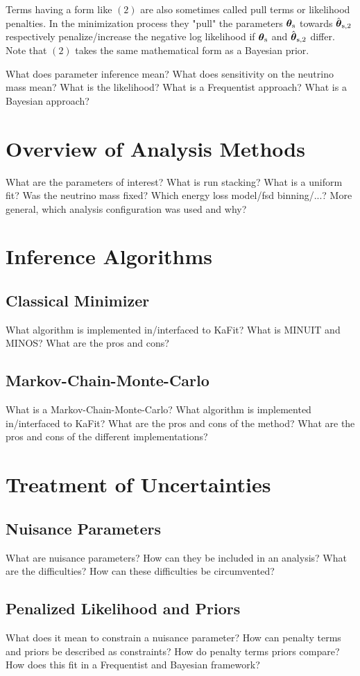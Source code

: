 Terms having a form like $(2)$ are also sometimes called pull terms or likelihood penalties. In the minimization process they "pull" the parameters $\boldsymbol{\mathbf{\theta}}_\mathrm{s}$ towards $\hat{\boldsymbol{\mathbf{\theta}}}_\mathrm{s,2}$ respectively penalize/increase the negative log likelihood if $\boldsymbol{\mathbf{\theta}}_\mathrm{s}$ and $\hat{\boldsymbol{\mathbf{\theta}}}_\mathrm{s,2}$ differ. Note that $(2)$ takes the same mathematical form as a Bayesian prior.

What does parameter inference mean? What does sensitivity on the neutrino mass mean? What is the likelihood? What is a Frequentist approach? What is a Bayesian approach? 
\section{Overview of Analysis Methods}
What are the parameters of interest? What is run stacking? What is a uniform fit? Was the neutrino mass fixed? Which energy loss model/fsd binning/...? More general, which analysis configuration was used and why?

\section{Inference Algorithms}
\subsection{Classical Minimizer}
What algorithm is implemented in/interfaced to KaFit? What is MINUIT and MINOS? What are the pros and cons?
\subsection{Markov-Chain-Monte-Carlo}
What is a Markov-Chain-Monte-Carlo?  What algorithm is implemented in/interfaced to KaFit? What are the pros and cons of the method? What are the pros and cons of the different implementations?

\section{Treatment of Uncertainties}
\subsection{Nuisance Parameters}
What are nuisance parameters? How can they be included in an analysis? What are the difficulties? How can these difficulties be circumvented?
\subsection{Penalized Likelihood and Priors}
What does it mean to constrain a nuisance parameter? How can penalty terms and priors be described as constraints? How do penalty terms priors compare? How does this fit in a Frequentist and Bayesian framework?
